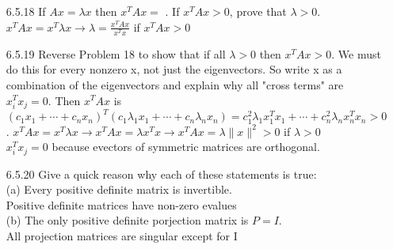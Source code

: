\documentclass[10pt,twoside,reqno]{article}
\begin{document}
\begin{enumerate}
\vspace{3mm}
\item[6.5.18] If $Ax = \lambda x$ then $x^TAx =$ \underline{\hspace{7mm}}. If $x^TAx > 0$, prove that $\lambda > 0$.\\
$x^TAx = x^T\lambda x \rightarrow \lambda = \frac{x^TAx}{x^Tx}$ if $x^TAx > 0$\\

\vspace{3mm}
\item[6.5.19] Reverse Problem 18 to show that if all $\lambda > 0$ then $x^TAx > 0$. We must do this for every nonzero x, not just the eigenvectors. So write x as a combination of the eigenvectors and explain why all "cross terms" are $x_i^Tx_j = 0$. Then $x^TAx$ is\\
\vspace{3mm}
$(c_1x_1 + \cdots + c_nx_n)^T(c_1\lambda_1x_1 + \cdots + c_n\lambda_nx_n) = c_1^2\lambda_1x_1^Tx_1 + \cdots + c_n^2\lambda_nx_n^Tx_n > 0$.
$x^TAx = x^T\lambda x \rightarrow x^TAx = \lambda x^Tx \rightarrow x^TAx = \lambda \lVert x \rVert^2 > 0$ if $\lambda > 0$\\
$x_i^T x_j = 0$ because evectors of symmetric matrices are orthogonal.\\

\vspace{3mm}
\item[6.5.20] Give a quick reason why each of these statements is true:\\
(a) Every positive definite matrix is invertible.\\
Positive definite matrices have non-zero evalues\\

\vspace{3mm}
(b) The only positive definite porjection matrix is $P = I$.\\
All projection matrices are singular except for I\\


\end{enumerate}
\end{document}
